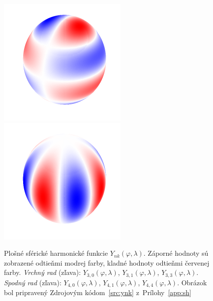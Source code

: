 \documentclass[a4paper, 12pt]{book}
\begin{document}
\begin{figure}[bt]
\includegraphics{./fig-spherical-harmonic-n4-k1.pdf}
\includegraphics{./fig-spherical-harmonic-n4-k4.pdf}
\caption{Plošné sférické harmonické funkcie $Y_{nk}(\varphi, \lambda)$.
Záporné hodnoty sú zobrazené odtieňmi modrej farby, kladné hodnoty odtieňmi
červenej farby.  \textit{Vrchný rad} (zľava): $Y_{3,0}(\varphi, \lambda)$,
$Y_{3,1}(\varphi, \lambda)$, $Y_{3,3}(\varphi, \lambda)$.  \textit{Spodný rad}
(zľava): $Y_{4,0}(\varphi, \lambda)$, $Y_{4,1}(\varphi, \lambda)$,
$Y_{4,4}(\varphi, \lambda)$.  Obrázok bol pripravený Zdrojovým
kódom~\ref{src:ynk} z~Prílohy~\ref{app:sh}}
\label{fig:sh}
\end{figure}
\end{document}
